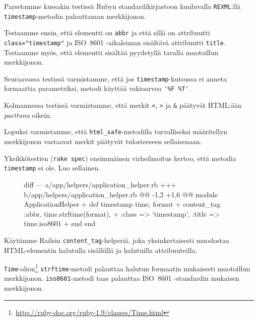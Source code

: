 \documentclass{article}
\newenvironment{myfigure}[1][tbp]{
  \begin{figure}[#1]
    \centering
    \begin{lrbox}{\myfigurebox}
      \begin{minipage}{\textwidth}
}{
      \end{minipage}
    \end{lrbox}
    \colorbox{blue!4}{\usebox{\myfigurebox}}
  \end{figure}
}
\begin{document}
Parsetamme kussakin testissä Rubyn standardikirjastoon kuuluvalla
\texttt{REXML}:llä \texttt{timestamp}-metodin palauttaman merkkijonon.

Testaamme ensin, että elementti on \texttt{abbr} ja että sillä on attribuutti
\texttt{class="timestamp"} ja ISO~8601 -aikaleiman sisältävä attribuutti
\texttt{title}. Testaamme myös, että elementti sisältää pyydetyllä tavalla
muotoillun merkkijonon.

Seuraavassa testissä varmistamme, että jos \texttt{timestamp}-kutsussa ei
anneta formaattia parametriksi, metodi käyttää vakioarvoa \verb!'%F %T'!.

Kolmannessa testissä varmistamme, että merkit \texttt{<}, \texttt{>} ja
\texttt{\&} päätyvät HTML:ään \emph{paettuna} oikein.

Lopuksi varmistamme, että \texttt{html\_safe}-metodilla turvalliseksi
määritellyn merkkijonon vastaavat merkit päätyvät tulosteeseen sellaisenaan.

\begin{samepage}
Yksikkötestien (\texttt{rake spec}) ensimmäinen virheilmoitus kertoo, että
metodia \texttt{timestamp} ei ole. Luo sellainen.

\begin{myfigure}[H]
\begin{pygmented}{diff}
--- a/app/helpers/application_helper.rb
+++ b/app/helpers/application_helper.rb
@@ -1,2 +1,6 @@
 module ApplicationHelper
+  def timestamp time, format
+    content_tag :abbr, time.strftime(format),
+                :class => 'timestamp', :title => time.iso8601
+  end
 end
\end{pygmented}
\end{myfigure}
\end{samepage}

Käytämme Railsin \texttt{content\_tag}-helperiä, joka yksinkertaisesti
muodostaa HTML-elementin halutulla sisällöllä ja halutuilla attribuuteilla.

\texttt{Time}-olion\footnote{\url{http://ruby-doc.org/ruby-1.9/classes/Time.html}}
\texttt{strftime}-metodi palauttaa halutun formaatin mukaisesti muotoillun
merkkijonon. \texttt{iso8601}-metodi taas palauttaa ISO~8601 -standardin
mukaisen merkkijonon.
\end{document}
